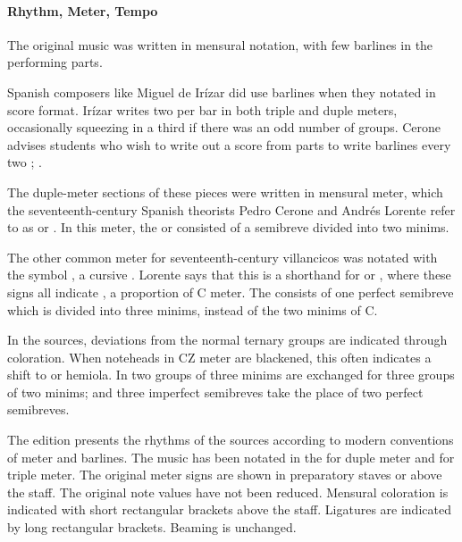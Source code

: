 \paragraph{Rhythm, Meter, Tempo}
The original music was written in mensural notation, with few barlines in the 
performing parts.%
\begin{Footnote}
    Spanish composers like Miguel de Irízar did use barlines when they notated in 
    score format.
    Irízar writes two  per bar in both triple and duple meters,
    occasionally squeezing in a third  if there was an odd number
    of groups.
    Cerone advises students who wish to write out a score from parts to write 
    barlines every two ; \textcite[745]{Cerone:Melopeo}.
\end{Footnote}
The duple-meter sections of these pieces were written in mensural \meterC{} 
meter, which the seventeenth-century Spanish theorists Pedro Cerone and Andrés 
Lorente refer to as  or .%
  \autocites[537]{Cerone:Melopeo}[156, 210]{Lorente:Porque}
In this meter, the  or  consisted of a semibreve 
divided into two minims.%
  \autocites{GonzalezValle:MusicaTexto}{GonzalezValle:CompasCabezon}

The other common meter for seventeenth-century villancicos was notated with the 
symbol \meterCZorig{}, a cursive \meterCZ{}.
Lorente says that this is a shorthand for \meterCThreeTwo{} or \meterCThree{},
where these signs all indicate , a 
proportion of C meter.%
  \autocite[165]{Lorente:Porque}
The  consists of one perfect semibreve which is divided into three 
minims, instead of the two minims of C.

In the sources, deviations from the normal ternary groups are indicated through 
coloration. 
When noteheads in CZ meter are blackened, this often indicates a shift to 
 or hemiola.
In  two groups of three minims are exchanged for three 
groups of two minims; and three imperfect semibreves take the place of two
perfect semibreves.

The edition presents the rhythms of the sources according to modern conventions 
of meter and barlines.
The music has been notated in the \meterC{} for duple meter and \meterCThree{}
for triple meter.
The original meter signs are shown in preparatory staves or above the staff.
The original note values have not been reduced.
Mensural coloration is indicated with short rectangular brackets above the 
staff.
Ligatures are indicated by long rectangular brackets.
Beaming is unchanged.


